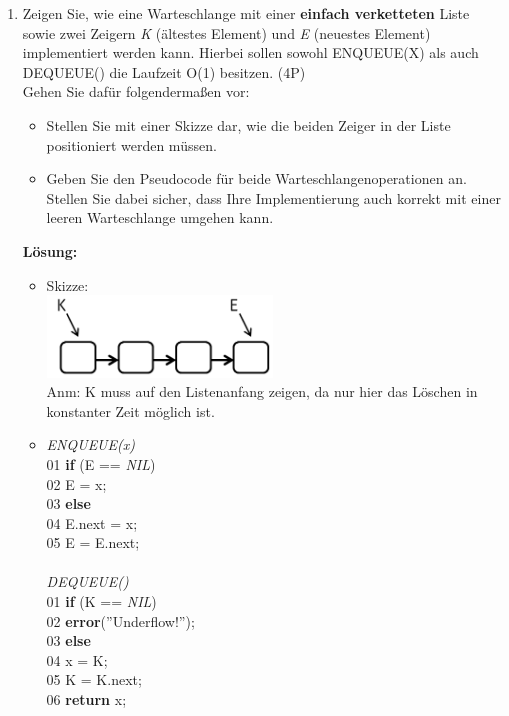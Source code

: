 \documentclass{scrartcl}
\begin{document}
\begin{enumerate}[(1)]
\item Zeigen Sie, wie eine Warteschlange mit einer \textbf{einfach verketteten} Liste sowie zwei Zeigern \textit{K} (ältestes Element) und \textit{E} (neuestes Element) implementiert werden kann. Hierbei sollen sowohl ENQUEUE(X) als auch DEQUEUE() die Laufzeit O(1) besitzen. (4P)\\
Gehen Sie dafür folgendermaßen vor:\\
\begin{itemize}
	\item Stellen Sie mit einer Skizze dar, wie die beiden Zeiger in der Liste positioniert werden müssen.
	\item Geben Sie den Pseudocode für beide Warteschlangenoperationen an. Stellen  Sie dabei sicher, dass Ihre Implementierung auch korrekt mit einer leeren Warteschlange umgehen kann.
\end{itemize}
\textbf{Lösung:}\\
\begin{itemize}
\item Skizze: \\
	\includegraphics[width=6cm]{images/QueueListe}\\
	Anm: K muss auf den Listenanfang zeigen, da nur hier das Löschen in konstanter Zeit möglich ist.
\item \textit{ENQUEUE(x)}\\
	01 \tab \textbf{if} (E == \textit{NIL})\\
	02 \tab \tab E = x;\\
	03 \tab \textbf{else\\}
	04 \tab \tab  E.next = x;\\
	05 \tab \tab E = E.next;\\
	\ \\
	\textit{DEQUEUE()}\\
	01 \tab \textbf{if} (K == \textit{NIL})\\
	02 \tab \tab \textbf{error}(''Underflow!'');\\
	03 \tab \textbf{else}\\
	04 \tab \tab x = K;\\
	05 \tab \tab K = K.next;\\
	06 \tab \tab \textbf{return} x;
\end{itemize}


\end{enumerate}
\end{document}
